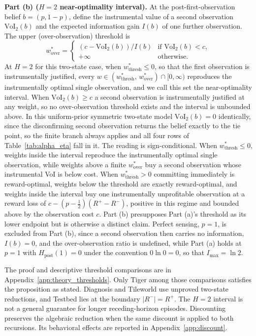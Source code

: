 \begin{proposition}
\textbf{Part (b) ($H{=}2$ near-optimality interval).} At the post-first-observation belief $b{=}(p, 1{-}p)$, define the instrumental value of a second observation $\mathrm{VoI}_2(b)$ and the expected information gain $I(b)$ of one further observation. The upper (over-observation) threshold is
\begin{equation*}
    w^*_{\mathrm{over}} = \begin{cases}
    (c - \mathrm{VoI}_2(b)) / I(b) & \text{if } \mathrm{VoI}_2(b) < c, \\
    +\infty & \text{otherwise.}
    \end{cases}
\end{equation*}
At $H{=}2$ for this two-state case, when $w^*_{\mathrm{thresh}} \leq 0$, so that the first observation is instrumentally justified, every $w \in (w^*_{\mathrm{thresh}},\, w^*_{\mathrm{over}}) \cap [0, \infty)$ reproduces the instrumentally optimal single observation, and we call this set the near-optimality interval. When $\mathrm{VoI}_2(b) \geq c$ a second observation is instrumentally justified at any weight, so no over-observation threshold exists and the interval is unbounded above. In this uniform-prior symmetric two-state model $\mathrm{VoI}_2(b) = 0$ identically, since the disconfirming second observation returns the belief exactly to the tie point, so the finite branch always applies and all four rows of Table~\ref{tab:alpha_eta} fall in it. The reading is sign-conditional. When $w^*_{\mathrm{thresh}} \leq 0$, weights inside the interval reproduce the instrumentally optimal single observation, while weights above a finite $w^*_{\mathrm{over}}$ buy a second observation whose instrumental VoI is below cost. When $w^*_{\mathrm{thresh}} > 0$ committing immediately is reward-optimal, weights below the threshold are exactly reward-optimal, and weights inside the interval buy one instrumentally unprofitable observation at a reward loss of $c - (p - \tfrac{1}{2})(R^+ - R^-)$, positive in this regime and bounded above by the observation cost $c$. Part (b) presupposes Part (a)'s threshold as its lower endpoint but is otherwise a distinct claim. Perfect sensing, $p{=}1$, is excluded from Part (b), since a second observation then carries no information, $I(b){=}0$, and the over-observation ratio is undefined, while Part (a) holds at $p{=}1$ with $H_{\text{post}}(1) = 0$ under the convention $0 \ln 0 = 0$, so that $I_{\max} = \ln 2$.
\end{proposition}

The proof and descriptive threshold comparisons are in Appendix~\ref{app:theory_thresholds}. Only Tiger among those comparisons satisfies the proposition as stated. Diagnosis and Tileworld use unproved two-state reductions, and Testbed lies at the boundary $|R^-|=R^+$. The $H=2$ interval is not a general guarantee for longer receding-horizon episodes. Discounting preserves the algebraic reduction when the same discount is applied to both recursions. Its behavioral effects are reported in Appendix~\ref{app:discount}.

